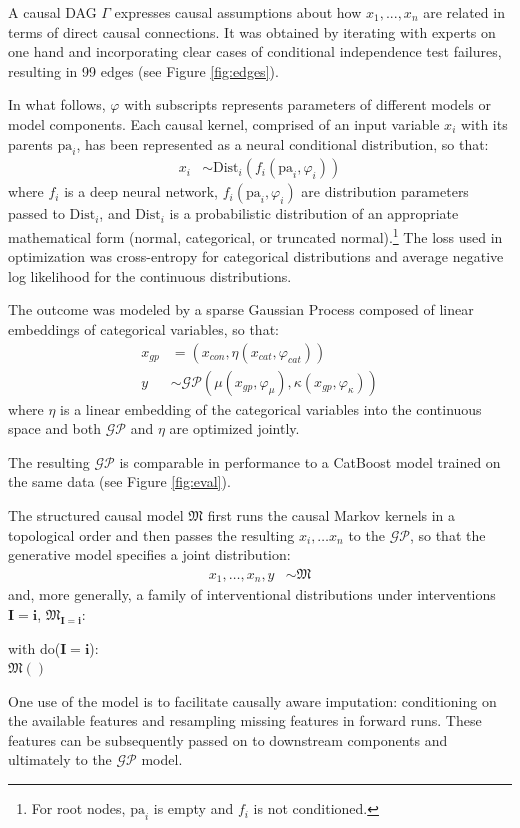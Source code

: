 \documentclass[twoside,11pt]{article}
\begin{document}
A causal DAG $\Gamma$ expresses causal assumptions about how $x_1, ...,x_n$ are related in terms of direct causal connections. It was obtained by iterating with experts on one hand and incorporating clear cases of conditional independence test failures, resulting in 99 edges (see Figure \ref{fig:edges}).





In what follows, $\varphi$ with subscripts represents parameters of different models or model components. Each causal kernel, comprised of an input variable $x_i$ with its parents $\mathrm{pa}_i$, has been represented as a neural conditional distribution, so that:
\begin{align}
x_i & \sim \mathrm{Dist}_i(f_i(\mathrm{pa}_i, \varphi_i))
\end{align}
\noindent where $f_i$ is a deep neural network, $f_i(\mathrm{pa}_i, \varphi_i)$ are distribution parameters passed to $\mathrm{Dist}_i$, and $\mathrm{Dist}_i$ is a probabilistic distribution of an appropriate mathematical form (normal, categorical, or truncated normal).\footnote{For root nodes, $\mathrm{pa}_i$ is empty and $f_i$ is not conditioned.} The loss used in optimization was cross-entropy for categorical distributions and average negative log likelihood for the continuous distributions.


The outcome was modeled by a sparse Gaussian Process composed of linear embeddings of categorical variables, so that:
\begin{align}
x_{gp} & = (x_{con}, \eta(x_{cat}, \varphi_{cat}) ) \\
y & \sim \mathcal{GP}\left(\mu(x_{gp}, \varphi_\mu), \kappa(x_{gp}, \varphi_\kappa)\right)
\end{align}
\noindent where $\eta$ is a linear embedding of the categorical variables into the continuous space and both $\mathcal{GP}$ and $\eta$ are optimized jointly.

The resulting $\mathcal{GP}$ is comparable in performance to a CatBoost model trained on the same data (see Figure \ref{fig:eval}).




The structured causal model $\mathfrak{M}$ first runs the causal Markov kernels in a topological order and then passes the resulting $x_i, \ldots x_n$ to the $\mathcal{GP}$, so that the generative model specifies a joint distribution:
\begin{align*}
x_1, \dots, x_n, y &\sim \mathfrak{M}
\end{align*}
\noindent and, more generally, a family of interventional distributions under interventions $\mathbf{I}=\mathbf{i}$, $\mathfrak{M}_{\mathbf{I}=\mathbf{i}}$:
\begin{docode}
    with do($\mathbf{I}=\mathbf{i}$):\\
    \hspace*{2em} $\mathfrak{M}()$
\end{docode}
One use of the model is to facilitate causally aware imputation: conditioning on the available features and resampling missing features in forward runs. These features can be subsequently passed on to downstream components and ultimately to the $\mathcal{GP}$ model.
\end{document}
